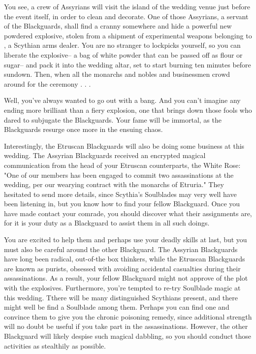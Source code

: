 \documentclass[char]{Kos}
\begin{document}
You see, a crew of Assyrians will visit the island of the wedding venue just before the event itself, in order to clean and decorate. One of those Assyrians, a servant of the Blackguards, shall find a cranny somewhere and hide a powerful new powdered explosive, stolen from a shipment of experimental weapons belonging to \cArmsDealer{}, a Scythian arms dealer. You are no stranger to lockpicks yourself, so you can liberate the explosive-- a bag of white powder that can be passed off as flour or sugar-- and pack it into the wedding altar, set to start burning ten minutes before sundown. Then, when all the monarchs and nobles and businessmen crowd around for the ceremony . . .

Well, you've always wanted to go out with a bang. And you can't imagine any ending more brilliant than a fiery explosion, one that brings down those fools who dared to subjugate the Blackguards. Your fame will be immortal, as the Blackguards resurge once more in the ensuing chaos.

Interestingly, the Etruscan Blackguards will also be doing some business at this wedding. The Assyrian Blackguards received an encrypted magical communication from the head of your Etruscan counterparts, the White Rose: "One of our members has been engaged to commit two assassinations at the wedding, per our wearying contract with the monarchs of Etruria." They hesitated to send more details, since Scythia's Soulblades may very well have been listening in, but you know how to find your fellow Blackguard. Once you have made contact your comrade, you should discover what their assignments are, for it is your duty as a Blackguard to assist them in all such doings.

You are excited to help them and perhaps use your deadly skills at last, but you must also be careful around the other Blackguard. The Assyrian Blackguards have long been radical, out-of-the box thinkers, while the Etruscan Blackguards are known as purists, obsessed with avoiding accidental casualties during their assassinations. As a result, your fellow Blackguard might not approve of the plot with the explosives. Furthermore, you're tempted to re-try Soulblade magic at this wedding. Tthere will be many distinguished Scythians present, and there might well be find a Soulblade among them. Perhaps you can find one and convince them to give you the chronic poisoning remedy, since additional strength will no doubt be useful if you take part in the assassinations. However, the other Blackguard will likely despise such magical dabbling, so you should conduct those activities as stealthily as possible.
\end{document}

